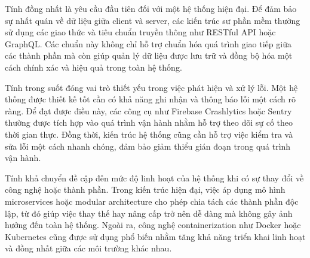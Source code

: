     \begin{flushleft}
        \hspace*{0.8cm}Tính đồng nhất là yêu cầu đầu tiên đối với một hệ thống hiện đại. Để đảm bảo sự nhất quán về dữ liệu giữa client và server, các kiến trúc sư phần mềm thường sử dụng các giao thức và tiêu chuẩn truyền thông như RESTful API hoặc GraphQL. Các chuẩn này không chỉ hỗ trợ chuẩn hóa quá trình giao tiếp giữa các thành phần mà còn giúp quản lý dữ liệu được lưu trữ và đồng bộ hóa một cách chính xác và hiệu quả trong toàn hệ thống.
      \end{flushleft}

      \begin{flushleft}
        \hspace*{0.8cm}Tính trong suốt đóng vai trò thiết yếu trong việc phát hiện và xử lý lỗi. Một hệ thống được thiết kế tốt cần có khả năng ghi nhận và thông báo lỗi một cách rõ ràng. Để đạt được điều này, các công cụ như Firebase Crashlytics hoặc Sentry thường được tích hợp vào quá trình vận hành nhằm hỗ trợ theo dõi sự cố theo thời gian thực. Đồng thời, kiến trúc hệ thống cũng cần hỗ trợ việc kiểm tra và sửa lỗi một cách nhanh chóng, đảm bảo giảm thiểu gián đoạn trong quá trình vận hành.
      \end{flushleft}

      \begin{flushleft}
        \hspace*{0.8cm}Tính khả chuyển đề cập đến mức độ linh hoạt của hệ thống khi có sự thay đổi về công nghệ hoặc thành phần. Trong kiến trúc hiện đại, việc áp dụng mô hình microservices hoặc modular architecture cho phép chia tách các thành phần độc lập, từ đó giúp việc thay thế hay nâng cấp trở nên dễ dàng mà không gây ảnh hưởng đến toàn hệ thống. Ngoài ra, công nghệ containerization như Docker hoặc Kubernetes cũng được sử dụng phổ biến nhằm tăng khả năng triển khai linh hoạt và đồng nhất giữa các môi trường khác nhau.
      \end{flushleft}

